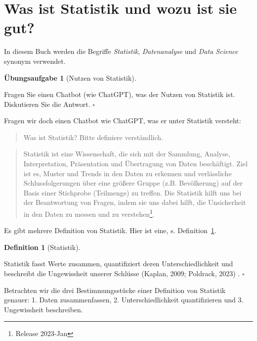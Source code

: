 \documentclass[
  letterpaper,
  twoside,
  open=any]{scrbook}
\theoremstyle{definition}
\newtheorem{exercise}{Übungsaufgabe}[chapter]
\theoremstyle{definition}
\theoremstyle{definition}
\newtheorem{definition}{Definition}[chapter]
\theoremstyle{remark}
\begin{document}
\section{Was ist Statistik und wozu ist sie
gut?}\label{was-ist-statistik-und-wozu-ist-sie-gut}

In diesem Buch werden die Begriffe \emph{Statistik}, \emph{Datenanalyse}
und \emph{Data Science} synonym verwendet.

\begin{exercise}[Nutzen von
Statistik]\protect\hypertarget{exr-nutzen-statistik}{}\label{exr-nutzen-statistik}

Fragen Sie einen Chatbot (wie ChatGPT), was der Nutzen von Statistik
ist. Diskutieren Sie die Antwort. \(\square\)

\end{exercise}

Fragen wir doch einen Chatbot wie ChatGPT, was er unter Statistik
versteht:

\begin{quote}
{} Was ist Statistik? Bitte definiere verständlich.
\end{quote}

\begin{quote}
{} Statistik ist eine Wissenschaft, die sich mit der
Sammlung, Analyse, Interpretation, Präsentation und Übertragung von
Daten beschäftigt. Ziel ist es, Muster und Trends in den Daten zu
erkennen und verlässliche Schlussfolgerungen über eine größere Gruppe
(z.B. Bevölkerung) auf der Basis einer Stichprobe (Teilmenge) zu
treffen. Die Statistik hilft uns bei der Beantwortung von Fragen, indem
sie uns dabei hilft, die Unsicherheit in den Daten zu messen und zu
verstehen\footnote{Release 2023-Jan}.
\end{quote}

Es gibt mehrere Definition von Statistik. Hier ist eine, s.
Definition~\ref{def-statistik}.

\begin{definition}[Statistik]\protect\hypertarget{def-statistik}{}\label{def-statistik}

Statistik fasst Werte zusammen, quantifiziert deren Unterschiedlichkeit
und beschreibt die Ungewissheit unserer Schlüsse (Kaplan, 2009;
Poldrack, 2023) . \(\square\)

\end{definition}

Betrachten wir die drei Bestimmungsstücke einer Definition von Statistik
genauer: 1. Daten zusammenfassen, 2. Unterschiedlichkeit quantifizieren
und 3. Ungewissheit beschreiben.
\end{document}
